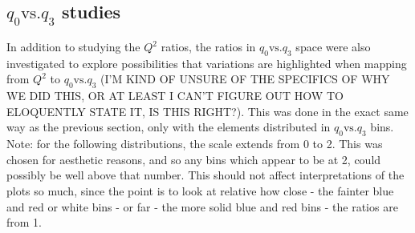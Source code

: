 \documentclass[12pt]{article}
\begin{document}
\subsection{$q_0 \textrm{vs.} q_3$ studies}

In addition to studying the $Q^2$ ratios, the ratios in $q_0 \textrm{vs.} q_3$ space were also investigated to explore possibilities that variations are highlighted when mapping from $Q^2$ to $q_0 \textrm{vs.} q_3$ (I'M KIND OF UNSURE OF THE SPECIFICS OF WHY WE DID THIS, OR AT LEAST I CAN'T FIGURE OUT HOW TO ELOQUENTLY STATE IT, IS THIS RIGHT?). This was done in the exact same way as the previous section, only with the elements distributed in $q_0 \textrm{vs.} q_3$ bins. Note: for the following distributions, the scale extends from 0 to 2. This was chosen for aesthetic reasons, and so any bins which appear to be at 2, could possibly be well above that number. This should not affect interpretations of the plots so much, since the point is to look at relative how close - the fainter blue and red or white bins - or far - the more solid blue and red bins - the ratios are from 1. 
\end{document}
